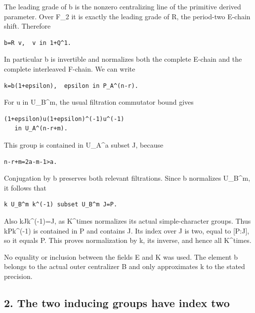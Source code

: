 The leading grade of b is the nonzero centralizing line of the primitive
derived parameter. Over F\_2 it is exactly the leading grade of R, the
period-two E-chain shift. Therefore

\begin{Verbatim}[fontsize=\small,breaklines=true,breakanywhere=true]
b=R v,  v in 1+Q^1.
\end{Verbatim}

In particular b is invertible and normalizes both the complete E-chain
and the complete interleaved F-chain. We can write

\begin{Verbatim}[fontsize=\small,breaklines=true,breakanywhere=true]
k=b(1+epsilon),  epsilon in P_A^(n-r).
\end{Verbatim}

For u in U\_B\^{}m, the usual filtration commutator bound gives

\begin{Verbatim}[fontsize=\small,breaklines=true,breakanywhere=true]
(1+epsilon)u(1+epsilon)^(-1)u^(-1)
   in U_A^(n-r+m).
\end{Verbatim}

This group is contained in U\_A\^{}a subset J, because

\begin{Verbatim}[fontsize=\small,breaklines=true,breakanywhere=true]
n-r+m=2a-m-1>a.
\end{Verbatim}

Conjugation by b preserves both relevant filtrations. Since b normalizes
U\_B\^{}m, it follows that

\begin{Verbatim}[fontsize=\small,breaklines=true,breakanywhere=true]
k U_B^m k^(-1) subset U_B^m J=P.
\end{Verbatim}

Also kJk\^{}(-1)=J, as K\^{}times normalizes its actual simple-character
groups. Thus kPk\^{}(-1) is contained in P and contains J. Its index
over J is two, equal to {[}P:J{]}, so it equals P. This proves
normalization by k, its inverse, and hence all K\^{}times.

No equality or inclusion between the fields E and K was used. The
element b belongs to the actual outer centralizer B and only
approximates k to the stated precision.

\hypertarget{rank4_stages-the-two-inducing-groups-have-index-two}{%
\subsection{2. The two inducing groups have index
two}\label{rank4_stages-the-two-inducing-groups-have-index-two}}

